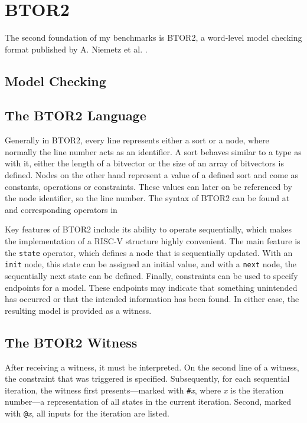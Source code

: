 \chapter{BTOR2}\label{chap:btor2}

The second foundation of my benchmarks is BTOR2, a word-level model checking
format published by A. Niemetz et al. \cite{btor2}.

\section{Model Checking}

\section{The BTOR2 Language}
Generally in BTOR2, every line represents either a sort or a node, where
normally the line number acts as an identifier. A sort behaves similar to a
type as with it, either the length of a bitvector or the size of an array of
bitvectors is defined. Nodes on the other hand represent a value of a defined
sort and come as constants, operations or constraints. These values can later
on be referenced by the node identifier, so the line number. The syntax of
BTOR2 can be found at \cite[figure 1]{btor2} and corresponding operators in
\cite[table 1]{btor2}

Key features of BTOR2 include its ability to operate sequentially, which makes
the implementation of a RISC-V structure highly convenient. The main feature is
the \texttt{state} operator, which defines a node that is sequentially updated.
With an \texttt{init} node, this state can be assigned an initial value, and
with a \texttt{next} node, the sequentially next state can be defined. Finally,
constraints can be used to specify endpoints for a model. These endpoints may
indicate that something unintended has occurred or that the intended
information has been found. In either case, the resulting model is provided as
a witness.

\section{The BTOR2 Witness}\label{witness}
After receiving a witness, it must be interpreted. On the second line of a
witness, the constraint that was triggered is specified. Subsequently, for each
sequential iteration, the witness first presents—marked with
\texttt{\#}\textit{x}, where \textit{x} is the iteration number—a
representation of all states in the current iteration. Second, marked with
\texttt{@}\textit{x}, all inputs for the iteration are listed.

